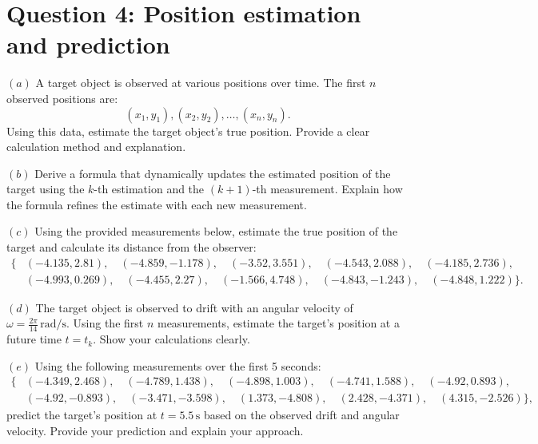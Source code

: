 \documentclass[a4paper, 12pt]{exam}
\begin{document}
\pagebreak
\section*{Question 4: Position estimation and prediction}

\noindent $(a)$ A target object is observed at various positions over time. The first \(n\) observed positions are:
\[
(x_1, y_1), (x_2, y_2), \dots, (x_n, y_n).
\]
Using this data, estimate the target object's true position. Provide a clear calculation method and explanation.

\bigskip

\noindent $(b)$ Derive a formula that dynamically updates the estimated position of the target using the \(k\)-th estimation and the \((k+1)\)-th measurement. Explain how the formula refines the estimate with each new measurement.

\bigskip

\noindent $(c)$ Using the provided measurements below, estimate the true position of the target and calculate its distance from the observer:
\[
\begin{aligned}
\{ 
&(-4.135, 2.81), \quad (-4.859, -1.178), \quad (-3.52, 3.551), \quad (-4.543, 2.088), \quad  (-4.185, 2.736), \\
&(-4.993, 0.269), \quad (-4.455, 2.27), \quad (-1.566, 4.748), \quad (-4.843, -1.243), \quad (-4.848, 1.222)
\}.
\end{aligned}
\]

\bigskip

\noindent $(d)$ The target object is observed to drift with an angular velocity of $\omega = \frac{2\pi}{14} \, \text{rad/s}$. Using the first \(n\) measurements, estimate the target’s position at a future time \(t = t_k\). Show your calculations clearly.

\bigskip

\noindent $(e)$ Using the following measurements over the first 5 seconds:
\[
\begin{aligned}
\{ 
&(-4.349, 2.468), \quad (-4.789, 1.438), \quad (-4.898, 1.003), \quad (-4.741, 1.588), \quad (-4.92, 0.893), \\
&(-4.92, -0.893), \quad (-3.471, -3.598), \quad (1.373, -4.808), \quad (2.428, -4.371), \quad (4.315, -2.526)
\},
\end{aligned}
\]
predict the target's position at \(t = 5.5 \, \text{s}\) based on the observed drift and angular velocity. Provide your prediction and explain your approach.

\bigskip
\end{document}
